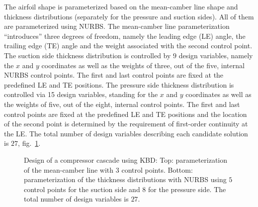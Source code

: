 The airfoil shape is parameterized based on the mean-camber line shape and thickness distributions (separately for the pressure and  suction sides). All of them are parameterized using NURBS. The mean-camber line parameterization ``introduces'' three degrees of freedom, namely the leading edge (LE) angle, the trailing edge (TE) angle and the weight associated with the second control point. The suction side thickness distribution is controlled by $9$ design variables, namely the $x$ and $y$ coordinates as well as the weights of three, out of the five, internal NURBS control points. The first and last control points are fixed at the predefined LE and TE positions. The pressure side thickness distribution is controlled via 15 design variables, standing for the $x$ and $y$ coordinates as well as the weights of five, out of the eight, internal control points. The first and last control points are fixed at the predefined LE and TE positions and the location of the second point is determined by the requirement of first-order continuity at the LE.  The total number of design variables describing each candidate solution is $27$, fig.\ \ref{CBRparam}. 

\begin{figure}[h!]
\begin{minipage}[b]{1\linewidth}
 \centering
\end{minipage}
\caption{Design of a compressor cascade using KBD: Top: parameterization of the mean-camber line with $3$ control points. Bottom:  parameterization of the thickness distributions with NURBS using $5$ control points for the suction side and $8$ for the pressure side. The total number of design variables is $27$.} 
\label{CBRparam}
\end{figure}

